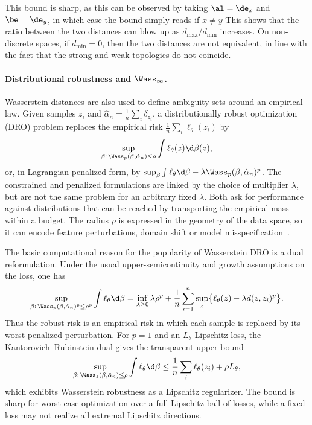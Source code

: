 This bound is sharp, as this can be observed by taking $\al=\de_{x}$ and $\be=\de_y$, in which case the bound simply reads if $x \neq y$
%
This shows that the ratio between the two distances can blow up as $d_{\max}/d_{\min}$ increases. On non-discrete spaces, if $d_{\min}=0$, then the two distances are not equivalent, in line with the fact that the strong and weak topologies do not coincide.

\paragraph{Distributional robustness and $\Wass_\infty$.}

Wasserstein distances are also used to define ambiguity sets around an empirical law. Given samples $z_i$ and $\hat\alpha_n=\frac1n\sum_i\delta_{z_i}$, a distributionally robust optimization (DRO) problem replaces the empirical risk $\frac1n\sum_i \ell_\theta(z_i)$ by
\[
	\sup_{\beta:\,\Wass_p(\beta,\hat\alpha_n)\leq \rho}
	\int \ell_\theta(z)\d\beta(z),
\]
or, in Lagrangian penalized form, by $\sup_\beta \int \ell_\theta\d\beta-\lambda\Wass_p(\beta,\hat\alpha_n)^p$. The constrained and penalized formulations are linked by the choice of multiplier $\lambda$, but are not the same problem for an arbitrary fixed $\lambda$. Both ask for performance against distributions that can be reached by transporting the empirical mass within a budget. The radius $\rho$ is expressed in the geometry of the data space, so it can encode feature perturbations, domain shift or model misspecification~\cite{esfahani2018data,BlanchetMurthy2019,GaoKleywegt2016}.

The basic computational reason for the popularity of Wasserstein DRO is a dual reformulation. Under the usual upper-semicontinuity and growth assumptions on the loss, one has
\begin{equation}\label{eq-dro-dual-envelope}
	\sup_{\beta:\,\Wass_p(\beta,\hat\alpha_n)^p\leq \rho^p}
	\int \ell_\theta\d\beta
	=
	\inf_{\lambda\geq0}
	\lambda\rho^p
	+
	\frac1n\sum_{i=1}^n
	\sup_z\bigl\{\ell_\theta(z)-\lambda d(z,z_i)^p\bigr\}.
\end{equation}
Thus the robust risk is an empirical risk in which each sample is replaced by its worst penalized perturbation. For $p=1$ and an $L_\theta$-Lipschitz loss, the Kantorovich--Rubinstein dual gives the transparent upper bound
\[
	\sup_{\beta:\,\Wass_1(\beta,\hat\alpha_n)\leq \rho}
	\int \ell_\theta\d\beta
	\leq
	\frac1n\sum_i\ell_\theta(z_i)+\rho L_\theta,
\]
which exhibits Wasserstein robustness as a Lipschitz regularizer. The bound is sharp for worst-case optimization over a full Lipschitz ball of losses, while a fixed loss may not realize all extremal Lipschitz directions.

